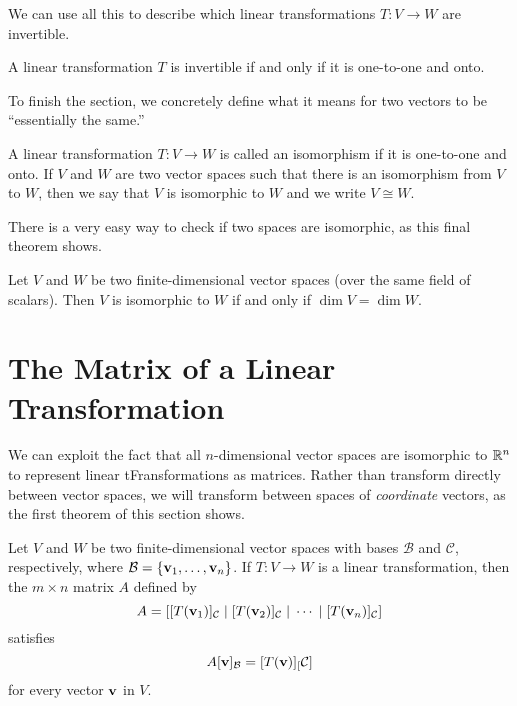 \documentclass[../m073main.tex]{subfiles}
\begin{document}
We can use all this to describe which linear transformations $T : V \to W$ are invertible.

\begin{theorem}
	A linear transformation $T$ is invertible if and only if it is one-to-one and onto.
\end{theorem}

To finish the section, we concretely define what it means for two vectors to be ``essentially the same.''

\begin{definition}[Isomorphism]
	A linear transformation $T : V \to W$ is called an isomorphism if it is one-to-one and onto.
	If $V$ and $W$ are two vector spaces such that there is an isomorphism from $V$ to $W$, then we say that $V$ is isomorphic to $W$ and we write $V \cong W$.
\end{definition}

There is a very easy way to check if two spaces are isomorphic, as this final theorem shows.

\begin{theorem}
	Let $V$ and $W$ be two finite-dimensional vector spaces (over the same field of scalars).
	Then $V$ is isomorphic to $W$ if and only if $\dim V = \dim W$.
\end{theorem}

\section{The Matrix of a Linear Transformation}
We can exploit the fact that all $n$-dimensional vector spaces are isomorphic to $\mathbb{R}^n$ to represent linear tFransformations as matrices.
Rather than transform directly between vector spaces, we will transform between spaces of \textit{coordinate} vectors, as the first theorem of this section shows.

\begin{theorem}
	Let $V$ and $W$ be two finite-dimensional vector spaces with bases $\mathcal{B}$ and $\mathcal{C}$, respectively, where $\mathcal{B} = \{\mathbf{v}_1, \ldots, \mathbf{v}_n\}$.
	If $T : V \to W$ is a linear transformation, then the $m \times n$ matrix $A$ defined by
	\[ A = [ [T(\mathbf{v}_1)]_{\mathcal{C}} \;|\; [T(\mathbf{v}_2)]_{\mathcal{C}} \;|\; \cdots \;|\; [T(\mathbf{v}_n)]_{\mathcal{C}} ] \]
	satisfies
	\[ A [\mathbf{v}]_{\mathcal{B}} = [T(\mathbf{v})]_[\mathcal{C}] \]
	for every vector $\mathbf{v}$ in $V$.
\end{theorem}
\end{document}
